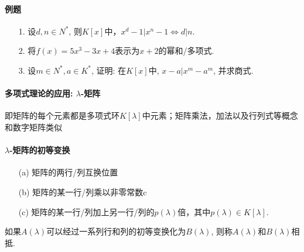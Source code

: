 \paragraph{例题}
\begin{itemize}
  \item[1.] 设$d,n\in N^*$, 则$K[x]$中，$x^d-1|x^n-1 \Longleftrightarrow d|n$.
  \vspace{1.5cm}

  \item[2.] 将$f(x)=5x^3-3x+4$表示为$x+2$的幂和/多项式.
  \vspace{1.5cm}

  \item[3.] 设$m \in N^*, a\in K^*$, 证明: 在$K[x]$中, $x-a|x^m-a^m$, 并求商式.
  \vspace{1.5cm}
\end{itemize}

\paragraph{多项式理论的应用: $\lambda$-矩阵}
即矩阵的每个元素都是多项式环$K[\lambda]$中元素；矩阵乘法，加法以及行列式等概念和数字矩阵类似

\paragraph{$\lambda$-矩阵的初等变换}
\begin{itemize}
  \item [(a)] 矩阵的两行/列互换位置
  \item [(b)] 矩阵的某一行/列乘以非零常数c
  \item [(c)] 矩阵的某一行/列加上另一行/列的$p(\lambda)$倍，其中$p(\lambda) \in K[\lambda]$.
\end{itemize}
如果$A(\lambda)$可以经过一系列行和列的初等变换化为$B(\lambda)$,
则称$A(\lambda)$和$B(\lambda)$相抵.

